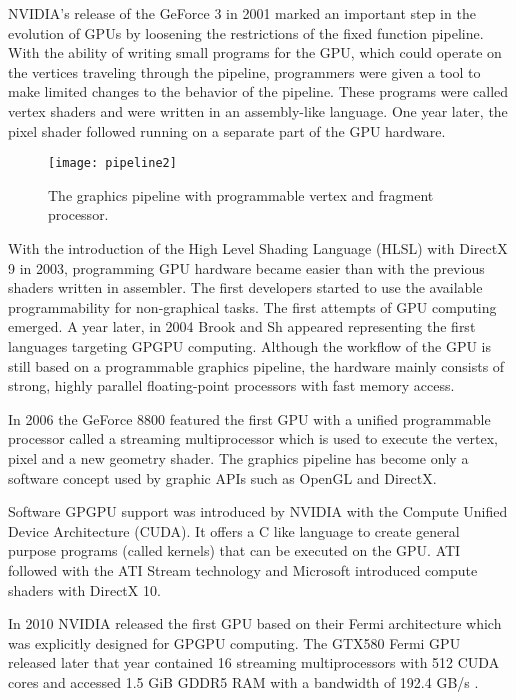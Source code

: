 NVIDIA's release of the GeForce 3 in 2001 marked an important step in the evolution of GPUs by loosening the restrictions of the fixed function pipeline. With the ability of writing small programs for the GPU, which could operate on the vertices traveling through the pipeline, programmers were given a tool to make limited changes to the behavior of the pipeline. These programs were called vertex shaders and were written in an assembly-like language. One year later, the pixel shader followed running on a separate part of the GPU hardware.

\begin{figure}[h] %
\centering
\texttt{[image: pipeline2]}
\caption{The graphics pipeline with programmable vertex and fragment processor. \cite{cg_book}}
\label{fig:pipeline2}
\end{figure}

With the introduction of the High Level Shading Language (HLSL) with DirectX 9 in 2003, programming GPU hardware became easier than with the previous shaders written in assembler. The first developers started to use the available programmability for non-graphical tasks. The first attempts of GPU computing emerged. A year later, in 2004 Brook and Sh appeared representing the first languages targeting GPGPU computing.
Although the workflow of the GPU is still based on a programmable graphics pipeline, the hardware mainly consists of strong, highly parallel floating-point processors with fast memory access.

In 2006 the GeForce 8800 featured the first GPU with a unified programmable processor called a streaming multiprocessor which is used to execute the vertex, pixel and a new geometry shader. The graphics pipeline has become only a software concept used by graphic APIs such as OpenGL and DirectX.

Software GPGPU support was introduced by NVIDIA with the Compute Unified Device Architecture (CUDA). It offers a C like language to create general purpose programs (called kernels) that can be executed on the GPU. ATI followed with the ATI Stream technology and Microsoft introduced compute shaders with DirectX 10.

In 2010 NVIDIA released the first GPU based on their Fermi architecture which was explicitly designed for GPGPU computing. The GTX580 Fermi GPU released later that year contained 16 streaming multiprocessors with 512 CUDA cores and accessed 1.5 GiB GDDR5 RAM with a bandwidth of 192.4 GB/s \cite{gtx580_spec}.


